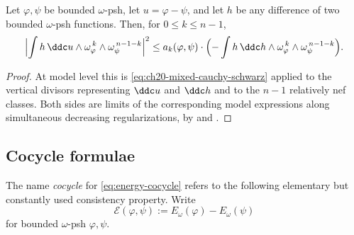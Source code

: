 \begin{corollary}
\label{cor:ch26-cauchy-schwarz}
Let \(\varphi,\psi\) be bounded \(\omega\)-psh, let \(u=\varphi-\psi\), and
let \(h\) be any difference of two bounded \(\omega\)-psh functions.  Then,
for \(0\leq k\leq n-1\),
\begin{equation}
\label{eq:ch26-cauchy-schwarz}
 \Bigl|\int h\,\ddc u\wedge
    \omega_\varphi^{\,k}\wedge\omega_\psi^{\,n-1-k}\Bigr|^2
 \leq
 a_k(\varphi,\psi)\cdot
 \Bigl(-\int h\,\ddc h\wedge
    \omega_\varphi^{\,k}\wedge\omega_\psi^{\,n-1-k}\Bigr).
\end{equation}
\end{corollary}

\begin{proof}
At model level this is \eqref{eq:ch20-mixed-cauchy-schwarz} applied to the
vertical divisors representing \(\ddc u\) and \(\ddc h\) and to the \(n-1\)
relatively nef classes.  Both sides are limits of the corresponding model
expressions along simultaneous decreasing regularizations, by
 and
.
\end{proof}

\subsection{Cocycle formulae}
\label{sec:ch26-cocycle-formulae}

The name \emph{cocycle} for \eqref{eq:energy-cocycle} refers to the following
elementary but constantly used consistency property.  Write
\[
 \mathcal E(\varphi,\psi):=E_\omega(\varphi)-E_\omega(\psi)
\]
for bounded \(\omega\)-psh \(\varphi,\psi\).

